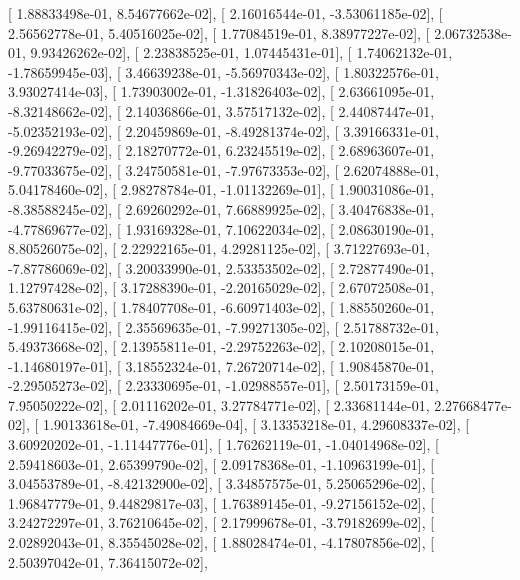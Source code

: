 \documentclass{article}
\begin{document}
       [  1.88833498e-01,   8.54677662e-02],
       [  2.16016544e-01,  -3.53061185e-02],
       [  2.56562778e-01,   5.40516025e-02],
       [  1.77084519e-01,   8.38977227e-02],
       [  2.06732538e-01,   9.93426262e-02],
       [  2.23838525e-01,   1.07445431e-01],
       [  1.74062132e-01,  -1.78659945e-03],
       [  3.46639238e-01,  -5.56970343e-02],
       [  1.80322576e-01,   3.93027414e-03],
       [  1.73903002e-01,  -1.31826403e-02],
       [  2.63661095e-01,  -8.32148662e-02],
       [  2.14036866e-01,   3.57517132e-02],
       [  2.44087447e-01,  -5.02352193e-02],
       [  2.20459869e-01,  -8.49281374e-02],
       [  3.39166331e-01,  -9.26942279e-02],
       [  2.18270772e-01,   6.23245519e-02],
       [  2.68963607e-01,  -9.77033675e-02],
       [  3.24750581e-01,  -7.97673353e-02],
       [  2.62074888e-01,   5.04178460e-02],
       [  2.98278784e-01,  -1.01132269e-01],
       [  1.90031086e-01,  -8.38588245e-02],
       [  2.69260292e-01,   7.66889925e-02],
       [  3.40476838e-01,  -4.77869677e-02],
       [  1.93169328e-01,   7.10622034e-02],
       [  2.08630190e-01,   8.80526075e-02],
       [  2.22922165e-01,   4.29281125e-02],
       [  3.71227693e-01,  -7.87786069e-02],
       [  3.20033990e-01,   2.53353502e-02],
       [  2.72877490e-01,   1.12797428e-02],
       [  3.17288390e-01,  -2.20165029e-02],
       [  2.67072508e-01,   5.63780631e-02],
       [  1.78407708e-01,  -6.60971403e-02],
       [  1.88550260e-01,  -1.99116415e-02],
       [  2.35569635e-01,  -7.99271305e-02],
       [  2.51788732e-01,   5.49373668e-02],
       [  2.13955811e-01,  -2.29752263e-02],
       [  2.10208015e-01,  -1.14680197e-01],
       [  3.18552324e-01,   7.26720714e-02],
       [  1.90845870e-01,  -2.29505273e-02],
       [  2.23330695e-01,  -1.02988557e-01],
       [  2.50173159e-01,   7.95050222e-02],
       [  2.01116202e-01,   3.27784771e-02],
       [  2.33681144e-01,   2.27668477e-02],
       [  1.90133618e-01,  -7.49084669e-04],
       [  3.13353218e-01,   4.29608337e-02],
       [  3.60920202e-01,  -1.11447776e-01],
       [  1.76262119e-01,  -1.04014968e-02],
       [  2.59418603e-01,   2.65399790e-02],
       [  2.09178368e-01,  -1.10963199e-01],
       [  3.04553789e-01,  -8.42132900e-02],
       [  3.34857575e-01,   5.25065296e-02],
       [  1.96847779e-01,   9.44829817e-03],
       [  1.76389145e-01,  -9.27156152e-02],
       [  3.24272297e-01,   3.76210645e-02],
       [  2.17999678e-01,  -3.79182699e-02],
       [  2.02892043e-01,   8.35545028e-02],
       [  1.88028474e-01,  -4.17807856e-02],
       [  2.50397042e-01,   7.36415072e-02],
\end{document}

